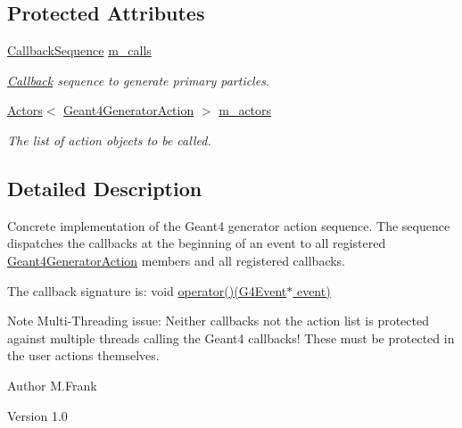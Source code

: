 \subsection*{Protected Attributes}
\begin{DoxyCompactItemize}
\item 
\hyperlink{struct_d_d4hep_1_1_callback_sequence}{CallbackSequence} \hyperlink{class_d_d4hep_1_1_simulation_1_1_geant4_generator_action_sequence_a3861258f355c58bb19602e7d099c1c9e}{m\_\-calls}
\begin{DoxyCompactList}\small\item\em \hyperlink{class_d_d4hep_1_1_callback}{Callback} sequence to generate primary particles. \item\end{DoxyCompactList}\item 
\hyperlink{class_d_d4hep_1_1_simulation_1_1_geant4_action_1_1_actors}{Actors}$<$ \hyperlink{class_d_d4hep_1_1_simulation_1_1_geant4_generator_action}{Geant4GeneratorAction} $>$ \hyperlink{class_d_d4hep_1_1_simulation_1_1_geant4_generator_action_sequence_a89614165b2d4cf32bbed637abca203d1}{m\_\-actors}
\begin{DoxyCompactList}\small\item\em The list of action objects to be called. \item\end{DoxyCompactList}\end{DoxyCompactItemize}


\subsection{Detailed Description}
Concrete implementation of the Geant4 generator action sequence. The sequence dispatches the callbacks at the beginning of an event to all registered \hyperlink{class_d_d4hep_1_1_simulation_1_1_geant4_generator_action}{Geant4GeneratorAction} members and all registered callbacks.

The callback signature is: void \hyperlink{class_d_d4hep_1_1_simulation_1_1_geant4_generator_action_sequence_a60e6a124a4d378fbf6a980137f5290cf}{operator()(G4Event$\ast$ event)}

Note Multi-\/Threading issue: Neither callbacks not the action list is protected against multiple threads calling the Geant4 callbacks! These must be protected in the user actions themselves.

\begin{DoxyAuthor}{Author}
M.Frank 
\end{DoxyAuthor}
\begin{DoxyVersion}{Version}
1.0 
\end{DoxyVersion}


